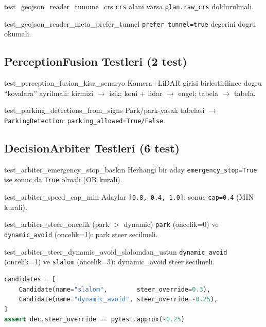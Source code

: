 \documentclass[a4paper,12pt]{article}
\begin{document}
\begin{testbox}{test\_geojson\_reader\_tumune\_crs}
\texttt{crs} alani varsa \texttt{plan.raw\_crs} doldurulmali.
\end{testbox}

\begin{testbox}{test\_geojson\_reader\_meta\_prefer\_tunnel}
\texttt{prefer\_tunnel=true} degerini dogru okumali.
\end{testbox}

\subsection{PerceptionFusion Testleri (2 test)}

\begin{testbox}{test\_perception\_fusion\_kisa\_senaryo}
Kamera+LiDAR girisi birlestirilince dogru ``kovalara'' ayrilmali:
kirmizi $\to$ isik; koni + lidar $\to$ engel; tabela $\to$ tabela.
\end{testbox}

\begin{testbox}{test\_parking\_detections\_from\_signs}
Park/park-yasak tabelasi $\to$ \texttt{ParkingDetection}:
\texttt{parking\_allowed=True/False}.
\end{testbox}

\subsection{DecisionArbiter Testleri (6 test)}

\begin{testbox}{test\_arbiter\_emergency\_stop\_baskın}
Herhangi bir aday \texttt{emergency\_stop=True} ise sonuc da
\texttt{True} olmali (OR kurali).
\end{testbox}

\begin{testbox}{test\_arbiter\_speed\_cap\_min}
Adaylar \texttt{[0.8, 0.4, 1.0]}: sonuc \texttt{cap=0.4} (MIN kurali).
\end{testbox}

\begin{testbox}{test\_arbiter\_steer\_oncelik (park $>$ dynamic)}
\texttt{park} (oncelik=0) ve \texttt{dynamic\_avoid} (oncelik=1):
park steer secilmeli.
\end{testbox}

\begin{testbox}{test\_arbiter\_steer\_dynamic\_avoid\_slalomdan\_ustun}
\texttt{dynamic\_avoid} (oncelik=1) ve \texttt{slalom} (oncelik=3):
dynamic\_avoid steer secilmeli.
\begin{lstlisting}[language=Python]
candidates = [
    Candidate(name="slalom",        steer_override=0.3),
    Candidate(name="dynamic_avoid", steer_override=-0.25),
]
assert dec.steer_override == pytest.approx(-0.25)
\end{lstlisting}
\end{testbox}
\end{document}
